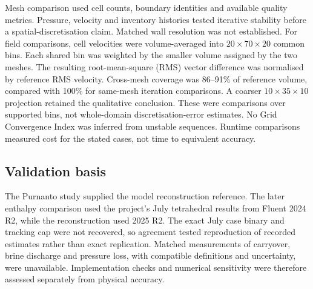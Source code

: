 Mesh comparison used cell counts, boundary identities and available quality metrics. Pressure, velocity and inventory histories tested iterative stability before a spatial-discretisation claim. Matched wall resolution was not established. For field comparisons, cell velocities were volume-averaged into \(20\times70\times20\) common bins. Each shared bin was weighted by the smaller volume assigned by the two meshes. The resulting root-mean-square (RMS) vector difference was normalised by reference RMS velocity. Cross-mesh coverage was 86--91\% of reference volume, compared with 100\% for same-mesh iteration comparisons. A coarser \(10\times35\times10\) projection retained the qualitative conclusion. These were comparisons over supported bins, not whole-domain discretisation-error estimates. No Grid Convergence Index was inferred from unstable sequences. Runtime comparisons measured cost for the stated cases, not time to equivalent accuracy.

\subsection{Validation basis}

The Purnanto study supplied the model reconstruction reference. The later enthalpy comparison used the project's July tetrahedral results from Fluent 2024 R2, while the reconstruction used 2025 R2. The exact July case binary and tracking cap were not recovered, so agreement tested reproduction of recorded estimates rather than exact replication. Matched measurements of carryover, brine discharge and pressure loss, with compatible definitions and uncertainty, were unavailable. Implementation checks and numerical sensitivity were therefore assessed separately from physical accuracy.
